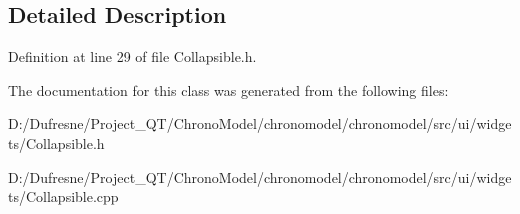 \subsection{Detailed Description}


Definition at line 29 of file Collapsible.\-h.



The documentation for this class was generated from the following files\-:\begin{DoxyCompactItemize}
\item 
D\-:/\-Dufresne/\-Project\-\_\-\-Q\-T/\-Chrono\-Model/chronomodel/chronomodel/src/ui/widgets/Collapsible.\-h\item 
D\-:/\-Dufresne/\-Project\-\_\-\-Q\-T/\-Chrono\-Model/chronomodel/chronomodel/src/ui/widgets/Collapsible.\-cpp\end{DoxyCompactItemize}

